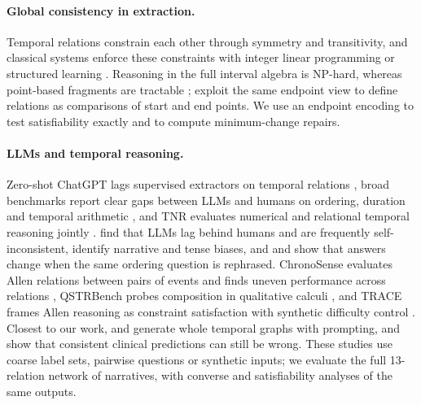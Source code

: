 \documentclass[11pt]{article}
\begin{document}
\paragraph{Global consistency in extraction.}
Temporal relations constrain each other through symmetry and transitivity, and classical systems enforce these constraints with integer linear programming or structured learning \citep{do-etal-2012-joint,chambers-etal-2014-dense,ning-etal-2017-structured,ning-etal-2018-joint,han-etal-2019-joint,han-etal-2019-deep}. Reasoning in the full interval algebra is NP-hard, whereas point-based fragments are tractable \citep{vilain1990constraint,nebel1995reasoning}; \citet{huang-etal-2023-classification} exploit the same endpoint view to define relations as comparisons of start and end points. We use an endpoint encoding to test satisfiability exactly and to compute minimum-change repairs.

\paragraph{LLMs and temporal reasoning.}
Zero-shot ChatGPT lags supervised extractors on temporal relations \citep{yuan-etal-2023-zero}, broad benchmarks report clear gaps between LLMs and humans on ordering, duration and temporal arithmetic \citep{chu-etal-2024-timebench,wang-zhao-2024-tram}, and TNR evaluates numerical and relational temporal reasoning jointly \citep{qian-etal-2026-beyond}. \citet{qiu-etal-2024-large} find that LLMs lag behind humans and are frequently self-inconsistent, \citet{fang-etal-2024-getting} identify narrative and tense biases, and \citet{kim-hwang-2025-counterfactual} and \citet{yang-etal-2026-temporal} show that answers change when the same ordering question is rephrased. ChronoSense evaluates Allen relations between pairs of events and finds uneven performance across relations \citep{islakoglu-kalo-2025-chronosense}, QSTRBench probes composition in qualitative calculi \citep{cohn2026qstrbenchnewbenchmarkevaluate}, and TRACE frames Allen reasoning as constraint satisfaction with synthetic difficulty control \citep{zhou2026temporalreasoningbenchmarkingframework}. Closest to our work, \citet{eirew2025beyond} and \citet{zhang-etal-2024-narrative} generate whole temporal graphs with prompting, and \citet{kougia-etal-2024-analysing} show that consistent clinical predictions can still be wrong. These studies use coarse label sets, pairwise questions or synthetic inputs; we evaluate the full 13-relation network of narratives, with converse and satisfiability analyses of the same outputs.
\end{document}
